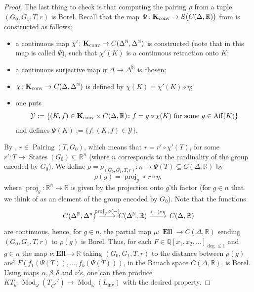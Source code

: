 \documentclass[12pt]{amsart}
\DeclareMathOperator{\Mod}{Mod}
\DeclareMathOperator{\Ell}{\mathbf{Ell}}
\DeclareMathOperator{\Aff}{Aff}
\DeclareMathOperator{\inv}{inv}
\DeclareMathOperator{\Pairing}{Pairing}
\DeclareMathOperator{\States}{States}
\DeclareMathOperator{\proj}{proj}
\newcommand{\Lang}{L}
\newcommand{\Kconv}{\mathbf{K}_{\textnormal{conv}}}
\begin{document}
\begin{proof}
    The last thing to check is that computing the pairing $\rho$ from a tuple $(G_0,G_1,T,r)$ is Borel. 
    Recall that the map $\Psi \colon \Kconv \to S\bigl(C(\Delta, \mathbb{R})\bigr)$ from \cite[Lemma 4.4]{Farahturbulence2014} is constructed as follows:
    \begin{itemize}
        \item a continuous map $\chi' \colon \Kconv \to C(\Delta^{\mathbb{N}}, \Delta^{\mathbb{N}})$ is constructed (note that in \cite[Lemma 3.1]{farah2013descriptive} this map is called $\Psi$), such that $\chi'(K)$ is a continuous retraction onto $K$;
        \item a continuous surjective map $\eta \colon \Delta \to \Delta^{\mathbb{N}}$ is chosen;
        \item $\chi \colon \Kconv \to C(\Delta, \Delta^{\mathbb{N}})$ is defined by $\chi(K) = \chi'(K) \circ \eta$;
        \item one puts
        \[ \mathcal{Y} := \{ (K,f) \in \Kconv \times C(\Delta, \mathbb{R}) \colon f = g \circ \chi(K) \textnormal{ for some } g \in \Aff(K) \} \]
        and defines $\Psi(K) := \{ f \colon (K,f) \in \mathcal{Y} \}$.
    \end{itemize}
    By \cite[Definition 3.2]{farah2013descriptive}, $r \in \Pairing(T,G_0)$, which means that $r = r' \circ \chi'(T)$, for some $r' \colon T \to \States(G_0) \subseteq \mathbb{R}^{n}$ (where $n$ corresponds to the cardinality of the group encoded by $G_0$). We define $\rho = \rho_{(G_0,G_1,T,r)} \colon n \to \Psi(T) \subseteq C(\Delta, \mathbb{R})$ by
    \[ \rho(g)  = \proj_g \circ \ r \circ \eta, \]
    where $\proj_g \colon \mathbb{R}^n \to \mathbb{R}$ is given by the projection onto $g$'th factor (for $g \in n$ that we think of as an element of the group encoded by $G_0$). 
    Note that the functions
    \[\begin{tikzcd}
    	{C(\Delta^{\mathbb{N}}, \Delta^{n})} & {C(\Delta^{\mathbb{N}}, \mathbb{R})} & {C(\Delta, \mathbb{R})}
    	\arrow["{\proj_g \circ (-)}", from=1-1, to=1-2]
    	\arrow["{(-) \circ \eta}", from=1-2, to=1-3]
    \end{tikzcd}\]
    are continuous, hence, for $g \in n$, the partial map $\mu \colon \Ell \to C(\Delta, \mathbb{R})$ sending $(G_0,G_1,T,r)$ to $\rho(g)$ is Borel.
    Thus, for each $F \in \mathbb{Q}[x_1, x_2, \dots]_{\deg \leq 1}$ and $g \in n$ the map $\nu \colon \mathbf{Ell} \to \mathbb{R}$ taking $(G_0,G_1,T,r)$ to the distance between $\rho(g)$ and $F(f_1(\Psi(T)), \dots, f_k(\Psi(T)))$, in the Banach space $C(\Delta, \mathbb{R})$, is Borel. Using maps $\alpha, \beta, \delta$ and $\nu$'s, one can then produce $KT_u \colon \Mod_{\omega}(T_{C^*}') \to \Mod_{\omega}(\Lang_{\inv})$ with the desired property.
\end{proof}
\end{document}
